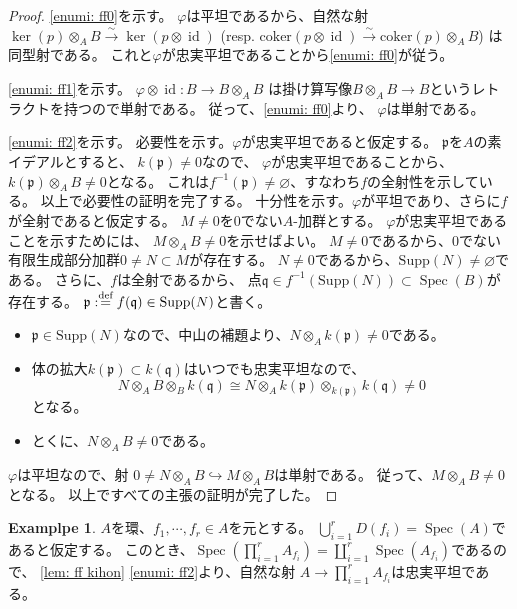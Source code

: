 \documentclass[uplatex]{jsarticle}
\theoremstyle{definition}
\newtheorem{exam}[exam]{Examplpe}
\DeclareMathOperator{\id}{\mathrm{id}}
\DeclareMathOperator{\Spec}{\mathrm{Spec}}
\newcommand{\Supp}{\mathrm{Supp}}
\newcommand{\coker}{\mathrm{coker}}
\renewcommand{\coprod}{\amalg}
\renewcommand{\emptyset}{\varnothing}
\newcommand{\dfn}{:\overset{\mbox{{\scriptsize def}}}{=}}
\newcommand{\mfp}{\mathfrak{p}}
\newcommand{\mfq}{\mathfrak{q}}
\begin{document}
\begin{proof}
  \ref{enumi: ff0}を示す。
  \(\varphi\)は平坦であるから、自然な射
  \(\ker(p)\otimes_A B \xrightarrow{\sim} \ker(p\otimes \id)\)
  (resp. \(\coker(p\otimes \id) \xrightarrow{\sim} \coker(p)\otimes_A B\))
  は同型射である。
  これと\(\varphi\)が忠実平坦であることから\ref{enumi: ff0}が従う。

  \ref{enumi: ff1}を示す。
  \(\varphi\otimes \id:B\to B\otimes_A B\)
  は掛け算写像\(B\otimes_A B\to B\)というレトラクトを持つので単射である。
  従って、\ref{enumi: ff0}より、
  \(\varphi\)は単射である。

  \ref{enumi: ff2}を示す。
  必要性を示す。\(\varphi\)が忠実平坦であると仮定する。
  \(\mfp\)を\(A\)の素イデアルとすると、
  \(k(\mfp)\neq 0\)なので、
  \(\varphi\)が忠実平坦であることから、
  \(k(\mfp)\otimes_A B \neq 0\)となる。
  これは\(f^{-1}(\mfp)\neq \emptyset\)、すなわち\(f\)の全射性を示している。
  以上で必要性の証明を完了する。
  十分性を示す。\(\varphi\)が平坦であり、さらに\(f\)が全射であると仮定する。
  \(M\neq 0\)を\(0\)でない\(A\)-加群とする。
  \(\varphi\)が忠実平坦であることを示すためには、
  \(M\otimes_A B\neq 0\)を示せばよい。
  \(M\neq 0\)であるから、\(0\)でない有限生成部分加群\(0\neq N \subset M\)が存在する。
  \(N\neq 0\)であるから、\(\Supp(N)\neq \emptyset\)である。
  さらに、\(f\)は全射であるから、
  点\(\mfq\in f^{-1}(\Supp(N))\subset \Spec(B)\)が存在する。
  \(\mfp \dfn f(\mfq) \in \Supp(N)\)と書く。
  \begin{itemize}
    \item \(\mfp\in \Supp(N)\)なので、中山の補題より、\(N\otimes_A k(\mfp)\neq 0\)である。
    \item 体の拡大\(k(\mfp)\subset k(\mfq)\)はいつでも忠実平坦なので、
    \[
    N\otimes_A B \otimes_B k(\mfq) \cong
    N\otimes_A k(\mfp) \otimes_{k(\mfp)} k(\mfq) \neq 0
    \]
    となる。
    \item とくに、\(N\otimes_AB\neq 0\)である。
  \end{itemize}
  \(\varphi\)は平坦なので、射
  \(0\neq N\otimes_A B\hookrightarrow M\otimes_A B\)は単射である。
  従って、\(M\otimes_A B \neq 0\)となる。
  以上ですべての主張の証明が完了した。
\end{proof}


\begin{exam}\label{exam: Zar cov ff}
  \(A\)を環、\(f_1,\cdots, f_r\in A\)を元とする。
  \(\bigcup_{i=1}^r D(f_i) = \Spec(A)\)であると仮定する。
  このとき、\(\Spec(\prod_{i=1}^r A_{f_i}) = \coprod_{i=1}^r \Spec(A_{f_i})\)であるので、
  \autoref{lem: ff kihon} \ref{enumi: ff2}より、自然な射
  \(A\to \prod_{i=1}^r A_{f_i}\)は忠実平坦である。
\end{exam}
\end{document}
